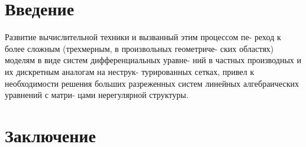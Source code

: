 \documentclass[a4paper, fontsize=14pt]{article}
\begin{document}
\tableofcontents

\thispagestyle{empty}
\newpage

\section*{Введение}

Развитие вычислительной техники и вызванный этим процессом пе-
реход к более сложным (трехмерным, в произвольных геометриче-
ских областях) моделям в виде систем дифференциальных уравне-
ний в частных производных и их дискретным аналогам на неструк-
турированных сетках, привел к необходимости решения больших
разреженных систем линейных алгебраических уравнений с матри-
цами нерегулярной структуры.

\newpage

\section*{Заключение}

\newpage


\end{document}
